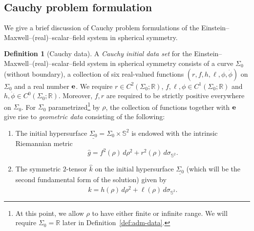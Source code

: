 \documentclass[10pt, reqno]{amsart}
\theoremstyle{definition}
\newtheorem{definition}[theorem]{Definition}
\theoremstyle{remark}
\numberwithin{equation}{section}
\newcommand{\ud}{d}
\newcommand{\0}{\emptyset}
\newcommand{\sgm}{\sigma}
\newcommand{\Sgm}{\Sigma}
\newcommand{\bbS}{\mathbb S}
\begin{document}
\subsection{Cauchy problem formulation}
We give a brief discussion of Cauchy problem formulations of the Einstein--Maxwell--(real)--scalar--field system in spherical symmetry. 
\begin{definition}[Cauchy data]\label{def.Cauchy.data}
A \emph{Cauchy initial data set} for the Einstein--Maxwell--(real)--scalar--field system in spherical symmetry consists of a curve $\Sgm_{0}$ (without boundary), a collection of six real-valued functions $(r, f, h, \ell, \phi, \dot{\phi})$ on $\Sgm_{0}$ and a real number ${\bf e}$. We require $r\in C^2(\Sgm_0;\mathbb R)$, $f,\ell,\phi\in C^1(\Sgm_0;\mathbb R)$ and $h,\dot{\phi}\in C^0(\Sgm_0;\mathbb R)$. Moreover, $f, r$ are required to be strictly positive everywhere on $\Sgm_0$. For $\Sgm_0$ parametrized\footnote{At this point, we allow $\rho$ to have either finite or infinite range. We will require $\Sgm_0=\mathbb R$ later in Definition~\ref{def:adm-data}.} by $\rho$, the collection of functions together with ${\bf e}$ give rise to \emph{geometric data} consisting of the following:
\begin{enumerate}
\item The initial hypersurface $\underline{\Sgm_{0}} = \Sgm_{0} \times \bbS^{2}$ is endowed with the intrinsic Riemannian metric
\begin{equation*}
\hat{g} = f^{2}(\rho) \, \ud \rho^2+ r^{2}(\rho) \, \ud \sgm_{\bbS^{2}}.
\end{equation*}

\item The symmetric $2$-tensor $\hat{k}$ on the initial hypersurface $\underline{\Sgm_{0}}$ (which will be the second fundamental form of the solution) given by
\begin{equation*}
	\hat{k} = h(\rho) \, \ud \rho^{2} + \ell(\rho) \, \ud \sgm_{\bbS^{2}}.
\end{equation*}


\end{enumerate}
\end{definition}
\end{document}
